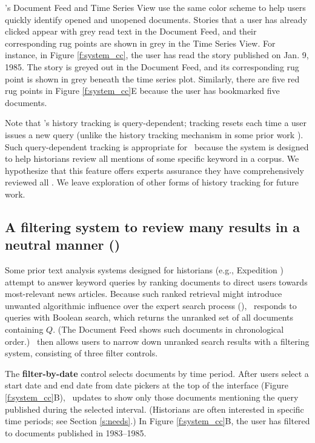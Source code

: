 \ours's Document Feed and Time Series View use the same color scheme to help users quickly identify opened and unopened documents. Stories that a user has already clicked appear with grey read text in the Document Feed, and their corresponding rug points are shown in grey in the Time Series View.
For instance, in Figure \ref{f:system_cc}, the user has read the story published on Jan. 9, 1985.
The story is greyed out in the Document Feed, and its corresponding rug point is shown in grey beneath the time series plot.
Similarly, there are five red rug points in Figure \ref{f:system_cc}E because the user has bookmarked five documents.

Note that \ours's history tracking is query-dependent; tracking resets each time a user issues a new query (unlike the history tracking mechanism in some prior work \cite[Section 6]{Footprints}).
Such query-dependent tracking is appropriate for \ours~because the system is designed to help historians review all mentions of some specific keyword in a corpus.
We hypothesize that this feature offers experts assurance they have comprehensively reviewed all \specificmention. 
We leave exploration of other forms of history tracking for future work.

\subsection{A filtering system to review many results in a neutral manner (\rnoconfound)}\label{s:dont_rank_filter}

Some prior text analysis systems designed for historians (e.g., Expedition \cite{expedition}) attempt to answer keyword queries by ranking documents to direct users towards most-relevant news articles.
Because such ranked retrieval might introduce unwanted algorithmic influence over the expert search process (\rnoconfound), \ours~responds to queries with Boolean search, which returns the unranked set of all documents containing $Q$.
(The Document Feed shows such documents in chronological order.)
\ours~then allows users to narrow down unranked search results with a filtering system, consisting of three filter controls.

The \textbf{filter-by-date} control selects documents by time period. After users select a start date and end date from date pickers at the top of the interface (Figure \ref{f:system_cc}B), \ours~updates to show only those documents mentioning the query published during the selected interval.
(Historians are often interested in specific time periods; see Section \ref{s:needs}.)
In Figure \ref{f:system_cc}B, the user has filtered to documents published in 1983--1985.

